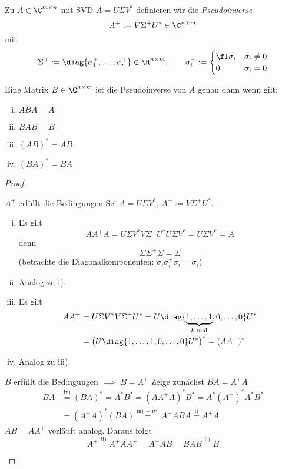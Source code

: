 \documentclass[11pt]{scrbook}
\begin{document}
\begin{df}[Pseudoinverse]
	\label{1.39}	
	Zu $A\in \C^{m\times n}$ mit SVD $A=U\Sigma V^*$ definieren wir die \emph{Pseudoinverse}
	\[
		A^+ := V \Sigma^+ U^* \in \C^{n\times m}
	\]
	mit
	\[
		\Sigma^+ := \diag\{\sigma_1^+,\dotsc, \sigma_r^+\} \in \R^{n\times m}
		,\qquad \sigma_i^+ := \begin{cases}
			\f 1{\sigma_i}	& \sigma_i \neq 0 \\
			0 & \sigma_i = 0
		\end{cases}
	\]
\end{df}

\begin{st}
	\label{1.40}
	Eine Matrix $B\in \C^{n\times m}$ ist die Pseudoinverse von $A$ genau dann wenn gilt:
	\begin{enumerate}[i)]
		\item
			$ABA = A$
		\item
			$BAB = B$
		\item
			$(AB)^* = AB$
		\item
			$(BA)^* = BA$
	\end{enumerate}
	\begin{proof}
		\begin{seg}{$A^+$ erfüllt die Bedingungen}
			Sei $A=U\Sigma V^*$, $A^+ := V\Sigma^+U^*$.
			\begin{enumerate}[i)]
				\item
					Es gilt
					\[
						AA^+A = U\Sigma V^* V \Sigma^+ U^* U \Sigma V^* = U\Sigma V^* = A
					\]
					denn
					\[
						\Sigma \Sigma^+ \Sigma = \Sigma
					\]
					(betrachte die Diagonalkomponenten: $\sigma_i \sigma_i^+ \sigma_i = \sigma_i$)
				\item
					Analog zu i).
				\item
					Es gilt
					\begin{align*}
						AA^+ &= U \Sigma V^* V \Sigma^+ U^* = U \diag\{\underbrace{1,\dotsc,1}_{k\text{-mal}},0,\dotsc, 0\} U^*\\ &= \big(U \diag\{1,\dotsc,1,0,\dotsc,0\} U^*\big)^* = (AA^+)^*
					\end{align*}
				\item
					Analog zu iii).
			\end{enumerate}
		\end{seg}
		\begin{seg}{$B$ erfüllt die Bedingungen $\implies$ $B=A^+$}
			Zeige zunächst $BA=A^+A$
			\begin{align*}
				BA &\stackrel{\text{iv)}}= (BA)^* = A^*B^* = (AA^+A)^*B^* = A^*(A^+)^*A^*B^*\\ &= (A^+A)^*(BA) \stackrel{\text{iii) + iv)}}= A^+ABA \stackrel{\text{i)}} = A^+A
			\end{align*}
			$AB=AA^+$ verläuft analog.
			Daraus folgt
			\[
				A^+ \stackrel{\text{ii)}}= A^+AA^+ = A^+AB = BAB \stackrel{\text{ii)}}= B 
			\]
		\end{seg}
	\end{proof}
\end{st}
\end{document}
